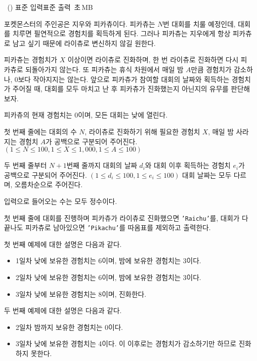 \begin{problem}{\kcpcprobpika\ (\kcpcprobpikashort)}
    {표준 입력}{표준 출력}
    {\kcpcprobpikatime\,초}{\kcpcprobpikamemory\,MB}{}
    
    포켓몬스터의 주인공은 지우와 피카츄이다. 피카츄는 $N$번 대회를 치룰 예정인데, 대회를 치루면 필연적으로 경험치를 획득하게 된다. 그러나 피카츄는 지우에게 항상 피카츄로 남고 싶기 때문에 라이츄로 변신하지 않길 원한다.
    
    피카츄는 경험치가 $X$ 이상이면 라이츄로 진화하며, 한 번 라이츄로 진화하면 다시 피카츄로 되돌아가지 않는다. 또 피카츄는 휴식 차원에서 매일 밤 $A$만큼 경험치가 감소하나, 0보다 작아지지는 않는다. 앞으로 피카츄가 참여할 대회의 날짜와 획득하는 경험치가 주어질 때, 대회를 모두 마치고 난 후 피카츄가 진화했는지 아닌지의 유무를 판단해보자.
    
    피카츄의 현재 경험치는 0이며, 모든 대회는 낮에 열린다.
    
    \InputFile
    첫 번째 줄에는 대회의 수 $N$, 라이츄로 진화하기 위해 필요한 경험치 $X$, 매일 밤 사라지는 경험치 $A$가 공백으로 구분되어 주어진다. $(1 \leq N \leq 100, 1 \leq X \leq 1,000, 1 \leq A \leq 100)$
    
    두 번째 줄부터 $N + 1$번째 줄까지 대회의 날짜 $d_i$와 대회 이후 획득하는 경험치 $e_i$가 공백으로 구분되어 주어진다. $(1 \leq d_i \leq 100, 1 \leq e_i \leq 100)$ 대회 날짜는 모두 다르며, 오름차순으로 주어진다.

    입력으로 들어오는 수는 모두 정수이다. 
    
    \OutputFile
    첫 번째 줄에 대회를 진행하며 피카츄가 라이츄로 진화했으면 \texttt{'Raichu'}를, 대회가 다 끝나도 피카츄로 남아있으면 \texttt{'Pikachu'}를 따옴표를 제외하고 출력한다.
    
    \Examples
    \begin{example}
    \end{example}
    
    \Explanation
    첫 번째 예제에 대한 설명은 다음과 같다.
    \begin{itemize}
        \item 1일차 낮에 보유한 경험치는 6이며, 밤에 보유한 경험치는 3이다.
        \item 2일차 낮에 보유한 경험치는 6이며, 밤에 보유한 경험치는 3이다.
        \item 3일차 낮에 보유한 경험치는 8이며, 진화한다.
    \end{itemize}
    두 번째 예제에 대한 설명은 다음과 같다.
    \begin{itemize}
        \item 2일차 밤까지 보유한 경험치는 0이다.
        \item 3일차 낮에 보유한 경험치는 4이다. 이 이후로는 경험치가 감소하기만 하므로 진화하지 못한다.
    \end{itemize}
\end{problem}

